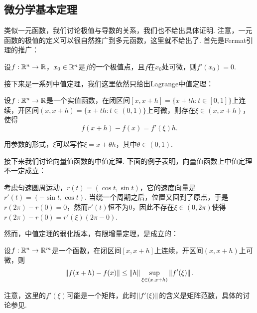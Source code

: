 \subsection{微分学基本定理}
类似一元函数，我们讨论极值与导数的关系，我们也不给出具体证明. 注意，一元函数的极值的定义可以很自然推广到多元函数，这里就不给出了. 首先是Fermat引理的推广：

\begin{lemma}[Fermat引理]\label{lemma:fermat-multi}
    设$f:\mathbb{R}^n\to\mathbb{R}$，$x_0\in\mathbb{R}^n$是$f$的一个极值点，且$f$在$x_0$处可微，则$f'(x_0)=0$.
\end{lemma}

接下来是一系列中值定理，我们这里依然只给出Lagrange中值定理：

\begin{theorem}[Lagrange中值定理]\label{thm:lagrange-mid-multi}
    设$f:\mathbb{R}^n\to\mathbb{R}$是一个实值函数，在闭区间$[x,x+h]=\{x+th:t\in[0,1]\}$上连续，开区间$(x,x+h)=\{x+th:t\in(0,1)\}$上可微，则存在$\xi\in(x,x+h)$，使得
    \[
        f(x+h)-f(x)=f'(\xi)h.
    \]
\end{theorem}
用参数的形式，$\xi$可以写作$\xi=x+\theta h$，其中$\theta\in(0,1)$.

接下来我们讨论向量值函数的中值定理. 下面的例子表明，向量值函数上中值定理不一定成立：
\begin{example}
考虑匀速圆周运动，$r(t)=(\cos t,\sin t)$，它的速度向量是$r'(t)=(-\sin t,\cos t)$. 当绕一个周期之后，位置又回到了原点，于是$r(2\pi)-r(0)=0$，然而$r'(t)$恒不为$0$，因此不存在$\xi\in(0,2\pi)$使得$r(2\pi)-r(0)=r'(\xi)(2\pi-0)$.
\end{example}
然而，中值定理的弱化版本，有限增量定理，是成立的：

\begin{theorem}[Lagrange有限增量定理]\label{thm:lagrange-finite-multi}
    设$f:\mathbb{R}^n\to\mathbb{R}^m$是一个函数，在闭区间$[x,x+h]$上连续，开区间$(x,x+h)$上可微，则
    \[
        \left\|f(x+h)-f(x)\right\|\leq \left\|h\right\|\sup_{\xi\in(x,x+h)}\left\|f'(\xi)\right\|.
    \]
\end{theorem}
注意，这里的$f'(\xi)$可能是一个矩阵，此时$\left\|f'(\xi)\right\|$的含义是矩阵范数，具体的讨论参见. 


